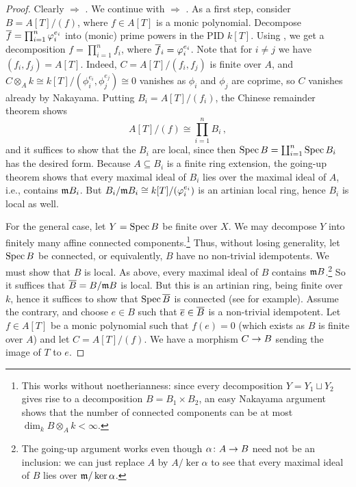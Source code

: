 \documentclass[a4paper, 10pt, oneside, DIV=9, chapterprefix=true, numbers=enddot, bibliography=totoc]{scrbook}
\begin{document}
\begin{proof}
	Clearly  $\Rightarrow$ . We continue with  $\Rightarrow$ . As a first step, consider $B=A[T]/(f)$, where $f\in A[T]$ is a monic polynomial. Decompose $\ov{f}=\prod_{i=1}^n\phi_i^{e_i}$ into (monic) prime powers in the PID $k[T]$. Using , we get a decomposition $f=\prod_{i=1}^nf_i$, where $\ov{f}_i=\phi_i^{e_i}$. Note that for $i\neq j$ we have $(f_i,f_j)=A[T]$. Indeed, $C=A[T]/(f_i,f_j)$ is finite over $A$, and $C\otimes_Ak\cong k[T]/(\phi_i^{e_i},\phi_j^{e_j})\cong 0$ vanishes as $\phi_i$ and $\phi_j$ are coprime, so $C$ vanishes already by Nakayama. Putting $B_i=A[T]/(f_i)$, the Chinese remainder theorem shows
	\begin{equation*}
		A[T]/(f)\cong\prod_{i=1}^nB_i\,,
	\end{equation*}
	and it suffices to show that the $B_i$ are local, since then $\operatorname{Spec} B=\coprod_{i=1}^n\operatorname{Spec} B_i$ has the desired form. Because $A\subseteq B_i$ is a finite ring extension, the going-up theorem shows that every maximal ideal of $B_i$ lies over the maximal ideal of $A$, i.e., contains $\mathfrak{m} B_i$. But $B_i/\mathfrak{m} B_i\cong k[T]/(\varphi_i^{e_i})$ is an artinian local ring, hence $B_i$ is local as well.
	
	For the general case, let $Y=\operatorname{Spec} B$ be finite over $X$. We may decompose $Y$ into finitely many affine connected components.\footnote{This works without noetherianness: since every decomposition $Y=Y_1\sqcup Y_2$ gives rise to a decomposition $B=B_1\times B_2$, an easy Nakayama argument shows that the number of connected components can be at most $\dim_kB\otimes_Ak<\infty$.} Thus, without losing generality, let $\operatorname{Spec} B$ be connected, or equivalently, $B$ have no non-trivial idempotents. We must show that $B$ is local. As above, every maximal ideal of $B$ contains $\mathfrak{m} B$.\footnote{\label{footnote:going-up}The going-up argument works even though $\alpha\colon A\morphism B$ need not be an inclusion: we can just replace $A$ by $A/\ker\alpha$ to see that every maximal ideal of $B$ lies over $\mathfrak{m}/\ker\alpha$.} So it suffices that $\ov{B}=B/\mm B$ is local. But this is an artinian ring, being finite over $k$, hence it suffices to show that $\Spec \ov{B}$ is connected (see \cite[Corollary~2.16]{eisenbudCommAlg} for example). Assume the contrary, and choose $e\in B$ such that $\ov{e}\in\ov{B}$ is a non-trivial idempotent. Let $f\in A[T]$ be a monic polynomial such that $f(e)=0$ (which exists as $B$ is finite over $A$) and let $C=A[T]/(f)$. We have a morphism $C\morphism B$ sending the image of $T$ to $e$. 
	

\end{proof}
\end{document}
